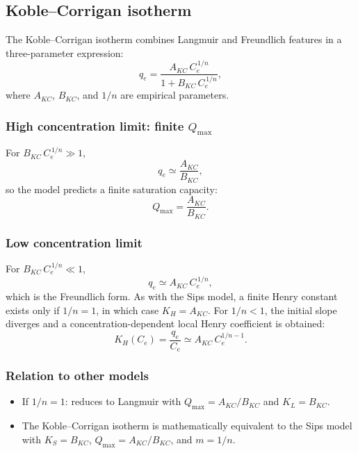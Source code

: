 \documentclass[12pt]{article}
\begin{document}
	\subsection{Koble--Corrigan isotherm}

	The Koble--Corrigan isotherm combines Langmuir and Freundlich
	features in a three-parameter expression:
	\begin{equation}
		q_e = \frac{A_{KC}\, C_e^{\,1/n}}{1 + B_{KC}\, C_e^{\,1/n}},
		\label{eq:KobleCorrigan}
	\end{equation}
	where $A_{KC}$, $B_{KC}$, and $1/n$ are empirical parameters.

	\subsubsection{High concentration limit: finite $Q_{\max}$}

	For $B_{KC}\,C_e^{\,1/n} \gg 1$,
	\begin{equation}
		q_e \simeq \frac{A_{KC}}{B_{KC}},
	\end{equation}
	so the model predicts a finite saturation capacity:
	\begin{equation}
		\boxed{Q_{\max} = \frac{A_{KC}}{B_{KC}}.}
	\end{equation}

	\subsubsection{Low concentration limit}

	For $B_{KC}\,C_e^{\,1/n} \ll 1$,
	\begin{equation}
		q_e \simeq A_{KC}\, C_e^{\,1/n},
	\end{equation}
	which is the Freundlich form. As with the Sips model, a finite
	Henry constant exists only if $1/n = 1$, in which case
	$K_H = A_{KC}$.  For $1/n < 1$, the initial slope diverges and
	a concentration-dependent local Henry coefficient is obtained:
	\begin{equation}
		K_H(C_e) = \frac{q_e}{C_e}
		\simeq A_{KC}\, C_e^{1/n - 1}.
	\end{equation}

	\subsubsection{Relation to other models}

	\begin{itemize}
		\item If $1/n = 1$: reduces to Langmuir with
		$Q_{\max} = A_{KC}/B_{KC}$ and $K_L = B_{KC}$.
		\item The Koble--Corrigan isotherm is mathematically equivalent
		to the Sips model with $K_S = B_{KC}$, $Q_{\max} = A_{KC}/B_{KC}$,
		and $m = 1/n$.
	\end{itemize}
\end{document}
